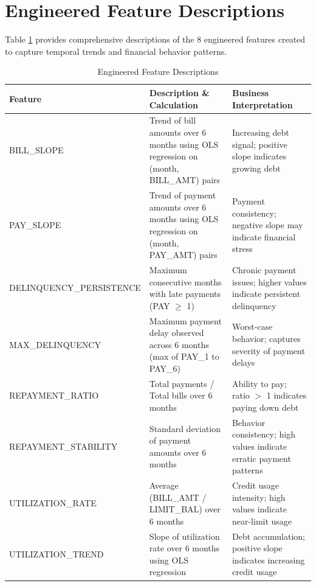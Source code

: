 \documentclass[12pt]{article}
\begin{document}
\section{Engineered Feature Descriptions}\label{app:engineered_features}

Table \ref{tab:engineered_features} provides comprehensive descriptions of the 8 engineered features created to capture temporal trends and financial behavior patterns.

\begin{table}[H]
\centering
\caption{Engineered Feature Descriptions}
\label{tab:engineered_features}
\small
\begin{tabular}{lp{7cm}p{3cm}}
\toprule
\textbf{Feature} & \textbf{Description \& Calculation} & \textbf{Business Interpretation} \\
\midrule
BILL\_SLOPE & Trend of bill amounts over 6 months using OLS regression on (month, BILL\_AMT) pairs & Increasing debt signal; positive slope indicates growing debt \\
\midrule
PAY\_SLOPE & Trend of payment amounts over 6 months using OLS regression on (month, PAY\_AMT) pairs & Payment consistency; negative slope may indicate financial stress \\
\midrule
DELINQUENCY\_PERSISTENCE & Maximum consecutive months with late payments (PAY $\geq$ 1) & Chronic payment issues; higher values indicate persistent delinquency \\
\midrule
MAX\_DELINQUENCY & Maximum payment delay observed across 6 months (max of PAY\_1 to PAY\_6) & Worst-case behavior; captures severity of payment delays \\
\midrule
REPAYMENT\_RATIO & Total payments / Total bills over 6 months & Ability to pay; ratio $>$ 1 indicates paying down debt \\
\midrule
REPAYMENT\_STABILITY & Standard deviation of payment amounts over 6 months & Behavior consistency; high values indicate erratic payment patterns \\
\midrule
UTILIZATION\_RATE & Average (BILL\_AMT / LIMIT\_BAL) over 6 months & Credit usage intensity; high values indicate near-limit usage \\
\midrule
UTILIZATION\_TREND & Slope of utilization rate over 6 months using OLS regression & Debt accumulation; positive slope indicates increasing credit usage \\
\bottomrule
\end{tabular}
\end{table}
\end{document}

